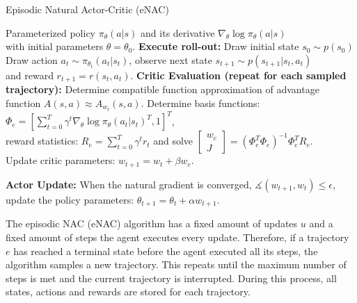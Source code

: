 \begin{algorithm}
	\caption{Episodic Natural Actor-Critic (eNAC)}\label{enac-algo}
	\begin{algorithmic}[1]
		\REQUIRE Parameterized policy $\pi_{\theta}(a|s)$ and its derivative $\nabla_\theta\log\pi_{\theta}(a|s)$\\
		\hspace{1.05cm}  with initial parameters $\theta=\theta_0$.
		\STATE \textbf{Execute roll-out:} Draw initial state $s_0 \sim p(s_0)$
		\STATE Draw action $a_t\sim\pi_{\theta_t}(a_t|s_t)$, observe next state $s_{t+1} \sim p(s_{t+1}|s_t, a_t)$\\
		and reward $r_{t+1} = r(s_t, a_t)$.
		\ENDFOR
		\ENDFOR
		\STATE \textbf{Critic Evaluation (repeat for each sampled trajectory):} Determine compatible function approximation of advantage function $A(s,a) \approx A_{w_t}(s, a)$.
		\STATE Determine basis functions: $\Phi_e = \left[\sum_{t=0}^T\gamma^t\nabla_\theta\log\pi_{\theta}(a_t|s_t)^T, 1\right]^T$, \\
		reward statistics: $R_e=\sum_{t=0}^T\gamma^t r_t$ and solve $\begin{bmatrix} w_{e}\\J \end{bmatrix} = (\Phi_e^T \Phi_e)^{-1} \Phi_e^T R_e$.\\
		Update critic parameters: $w_{t+1} = w_t + \beta w_{e}$.
		
		\STATE \textbf{Actor Update:} When the natural gradient is converged, $\measuredangle (w_{t+1}, w_t)\leq\epsilon$, update the policy parameters: $\theta_{t+1} = \theta_t + \alpha w_{t+1}$.
		\ENDFOR
	\end{algorithmic}
\end{algorithm}

\noindent The episodic NAC (eNAC) algorithm has a fixed amount of updates $u$ and a fixed amount of steps the agent executes every update. Therefore, if a trajectory $e$ has reached a terminal state before the agent executed all its steps, the algorithm samples a new trajectory. This repeats until the maximum number of steps is met and the current trajectory is interrupted. During this process, all states, actions and rewards are stored for each trajectory.


